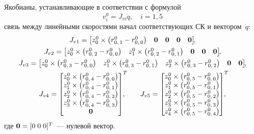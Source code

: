 Якобианы, устанавливающие в соответствии с формулой
\begin{equation}\label{eq_work_of_lin_jacobians}
    v^0_{i} = J_{vi}\dot{q}, \quad i = \overline{1,5}
\end{equation}
связь между линейными скоростями начал соответствующих СК и вектором~$\dot{q}$:
\begin{gather}
    J_{v1} =
    \begin{bmatrix}
        z^0_0 \times \left( r^0_{0,\,1} - r^0_{0,\,0}\right) & \nv & \nv & \nv & \nv
    \end{bmatrix}\!\!,
    \\
    J_{v2} =
    \begin{bmatrix}
        z^0_0 \times \left( r^0_{0,\,2} - r^0_{0,\,0}\right) & z^0_1 \times \left( r^0_{0,\,2} - r^0_{0,\,1}\right) & \nv & \nv & \nv
    \end{bmatrix}\!\!,
    \\
    J_{v3} =
    \begin{bmatrix}
        z^0_0 \times \left( r^0_{0,\,3} - r^0_{0,\,0}\right) & z^0_1 \times \left( r^0_{0,\,3} - r^0_{0,\,1}\right) &
        z^0_2 \times \left( r^0_{0,\,3} - r^0_{0,\,2}\right) & \nv & \nv
    \end{bmatrix}\!\!,
    \\
    J_{v4} =
    \begin{bmatrix}
        z^0_0 \times \left( r^0_{0,\,4} - r^0_{0,\,0}\right) \\
        z^0_1 \times \left( r^0_{0,\,4} - r^0_{0,\,1}\right) \\
        z^0_2 \times \left( r^0_{0,\,4} - r^0_{0,\,2}\right) \\
        z^0_3 \times \left( r^0_{0,\,4} - r^0_{0,\,3}\right) \\
        \nv
    \end{bmatrix}^T\!\!\!\!\!,
    \qquad
    J_{v5} =
    \begin{bmatrix}
        z^0_0 \times \left( r^0_{0,\,5} - r^0_{0,\,0}\right) \\
        z^0_1 \times \left( r^0_{0,\,5} - r^0_{0,\,1}\right) \\
        z^0_2 \times \left( r^0_{0,\,5} - r^0_{0,\,2}\right) \\
        z^0_3 \times \left( r^0_{0,\,5} - r^0_{0,\,3}\right) \\
        z^0_4 \times \left( r^0_{0,\,5} - r^0_{0,\,4}\right)
    \end{bmatrix}^T\!\!\!\!\!,
\end{gather}
где $\mathbf0 = [0\;0\;0]^T$~--- нулевой вектор.

